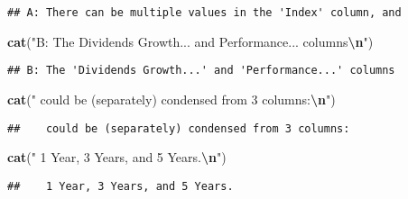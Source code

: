 \documentclass[
]{article}
\newenvironment{Shaded}{\begin{snugshade}}{\end{snugshade}}
\newcommand{\FunctionTok}[1]{\textcolor[rgb]{0.13,0.29,0.53}{\textbf{#1}}}
\newcommand{\NormalTok}[1]{#1}
\newcommand{\SpecialCharTok}[1]{\textcolor[rgb]{0.81,0.36,0.00}{\textbf{#1}}}
\newcommand{\StringTok}[1]{\textcolor[rgb]{0.31,0.60,0.02}{#1}}
\begin{document}
\begin{verbatim}
## A: There can be multiple values in the 'Index' column, and
\end{verbatim}

\begin{Shaded}
\begin{Highlighting}[]
\FunctionTok{cat}\NormalTok{(}\StringTok{"B: The \textquotesingle{}Dividends Growth...\textquotesingle{} and \textquotesingle{}Performance...\textquotesingle{} columns}\SpecialCharTok{\textbackslash{}n}\StringTok{"}\NormalTok{)}
\end{Highlighting}
\end{Shaded}

\begin{verbatim}
## B: The 'Dividends Growth...' and 'Performance...' columns
\end{verbatim}

\begin{Shaded}
\begin{Highlighting}[]
\FunctionTok{cat}\NormalTok{(}\StringTok{"   could be (separately) condensed from 3 columns:}\SpecialCharTok{\textbackslash{}n}\StringTok{"}\NormalTok{)}
\end{Highlighting}
\end{Shaded}

\begin{verbatim}
##    could be (separately) condensed from 3 columns:
\end{verbatim}

\begin{Shaded}
\begin{Highlighting}[]
\FunctionTok{cat}\NormalTok{(}\StringTok{"   1 Year, 3 Years, and 5 Years.}\SpecialCharTok{\textbackslash{}n}\StringTok{"}\NormalTok{)}
\end{Highlighting}
\end{Shaded}

\begin{verbatim}
##    1 Year, 3 Years, and 5 Years.
\end{verbatim}
\end{document}
